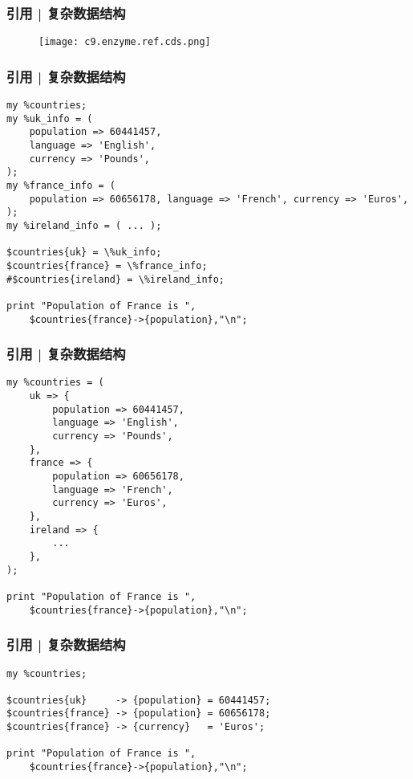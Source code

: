 \begin{frame}
  \frametitle{引用 | 复杂数据结构}
  \begin{figure}
    \centering
    \texttt{[image: c9.enzyme.ref.cds.png]}
  \end{figure}
\end{frame}

\begin{frame}[fragile]
  \frametitle{引用 | 复杂数据结构}
\begin{lstlisting}[basicstyle=\small\tt]
my %countries;
my %uk_info = (
    population => 60441457,
    language => 'English',
    currency => 'Pounds',
);
my %france_info = (
    population => 60656178, language => 'French', currency => 'Euros',
);
my %ireland_info = ( ... );

$countries{uk} = \%uk_info;
$countries{france} = \%france_info;
#$countries{ireland} = \%ireland_info;

print "Population of France is ",
    $countries{france}->{population},"\n";
\end{lstlisting}
\end{frame}

\begin{frame}[fragile]
  \frametitle{引用 | 复杂数据结构}
\begin{lstlisting}[basicstyle=\small\tt]
my %countries = (
    uk => {
        population => 60441457,
        language => 'English',
        currency => 'Pounds',
    },
    france => {
        population => 60656178,
        language => 'French',
        currency => 'Euros',
    },
    ireland => {
        ...
    },
);

print "Population of France is ",
    $countries{france}->{population},"\n";
\end{lstlisting}
\end{frame}

\begin{frame}[fragile]
  \frametitle{引用 | 复杂数据结构}
\begin{lstlisting}[basicstyle=\small\tt]
my %countries;

$countries{uk}     -> {population} = 60441457;
$countries{france} -> {population} = 60656178;
$countries{france} -> {currency}   = 'Euros';

print "Population of France is ",
    $countries{france}->{population},"\n";
\end{lstlisting}
\end{frame}

